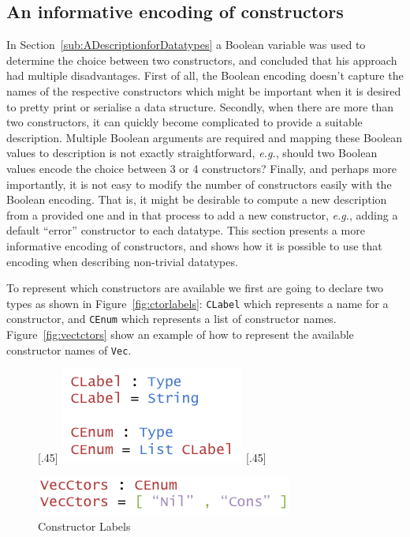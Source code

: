 \documentclass{ituthesis}
\newcommand{\tttype}[1]{\textcolor{type-color}{\texttt{#1}}}
\newcommand{\ttdec}[1]{\textcolor{declared-var-color}{\texttt{#1}}}
\theoremstyle{definition}
\begin{document}
\subsection{An informative encoding of constructors}
\label{sub:AnInformativeEncodingofConstructors}
In Section~\ref{sub:ADescriptionforDatatypes} a Boolean variable was used to determine the choice between two constructors, and concluded that his approach had multiple disadvantages.
First of all, the Boolean encoding doesn't capture the names of the respective constructors which might be important when it is desired to pretty print or serialise a data structure.
Secondly, when there are more than two constructors, it can quickly become complicated to provide a suitable description.
Multiple Boolean arguments are required and mapping these Boolean values to description is not exactly straightforward, \textit{e.g.},
should two Boolean values encode the choice between 3 or 4 constructors?
Finally, and perhaps more importantly, it is not easy to modify the number of constructors easily with the Boolean encoding. That is, it might be desirable to compute a new description from a provided one and in that process to add a new constructor,
\textit{e.g.}, adding a default ``error'' constructor to each datatype.
This section presents a more informative encoding of constructors, and shows how it is possible to use that encoding when describing non-trivial datatypes.

To represent which constructors are available we first are going to declare two types as shown in Figure~\ref{fig:ctorlabels}: \ttdec{CLabel} which represents a name for a constructor, and \ttdec{CEnum} which
represents a list of constructor names. Figure~\ref{fig:vectctors} show an example of how to represent the available constructor names of \tttype{Vec}.


\begin{figure}[ht]
\begin{center}
  [.45\textwidth]{
    \includegraphics[scale=0.5]{Figures/AnInformativeEncodingofConstructorsLabels.png}
}
[.45\textwidth]{
    \includegraphics[scale=0.5]{Figures/VectorConstructors.png}

}
\caption{Constructor Labels}
\end{center}
\end{figure}
\end{document}
